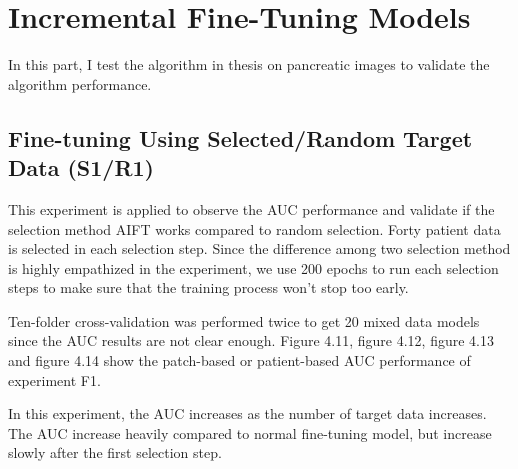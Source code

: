 \section{Incremental Fine-Tuning Models}
In this part, I test the algorithm in thesis \cite{zhou2017fine} on pancreatic images to validate the algorithm performance. 
\subsection{Fine-tuning Using Selected/Random Target Data (S1/R1)}
This experiment is applied to observe the AUC performance and validate if the selection method AIFT works compared to random selection. Forty patient data is selected in each selection step. Since the difference among two selection method is highly empathized in the experiment, we use 200 epochs to run each selection steps to make sure that the training process won't stop too early. 

Ten-folder cross-validation was performed twice to get 20 mixed data models since the AUC results are not clear enough.
Figure 4.11, figure 4.12, figure 4.13 and figure 4.14 show the patch-based or patient-based AUC performance of experiment F1. 

In this experiment, the AUC increases as the number of target data increases. The AUC increase heavily compared to normal fine-tuning model, but increase slowly after the first selection step.

